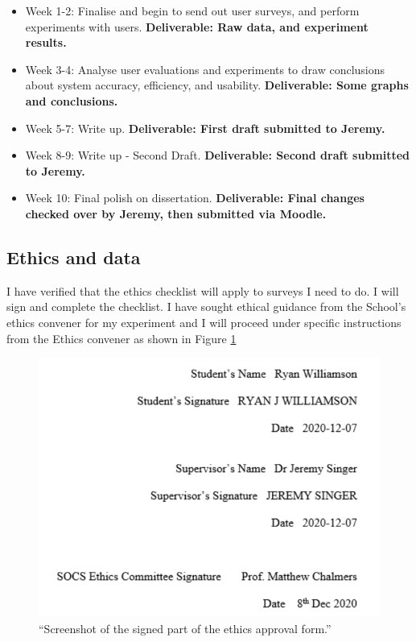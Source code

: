 \documentclass[11pt]{article}
\begin{document}
\begin{itemize}
    \setlength\itemsep{0.1em}
    \item
      Week 1-2: Finalise and begin to send out user surveys, and perform experiments 
      with users. \textbf{Deliverable: Raw data, and experiment results.}
    \item
      Week 3-4: Analyse user evaluations and experiments to draw conclusions about
      system accuracy, efficiency, and usability. \textbf{Deliverable: Some graphs 
      and conclusions.}
    \item
      Week 5-7: Write up. \textbf{Deliverable: First draft submitted to
      Jeremy.}
    \item
      Week 8-9: Write up - Second Draft. \textbf{Deliverable: Second draft submitted to
      Jeremy.}
    \item
      Week 10: Final polish on dissertation. \textbf{Deliverable: Final changes checked 
      over by Jeremy, then submitted via Moodle.}
    \end{itemize}

    
\subsection{Ethics and data}\label{ethics}

I have verified that the ethics checklist will apply to surveys I need to do. I will 
sign and complete the checklist.\linebreak
I have sought ethical guidance from the School's ethics convener for my experiment and
I will proceed under specific instructions from the Ethics convener as shown in 
Figure \ref{fig:socs_ethics_signature}

\begin{figure}[!ht]
    \centering
    \includegraphics[width=0.5\linewidth]{../images/pdf/socs_ethics_signature.pdf}
    
    \caption{
      ``Screenshot of the signed part of the ethics approval form.''
    }
    
    \label{fig:socs_ethics_signature}
\end{figure}
\end{document}
